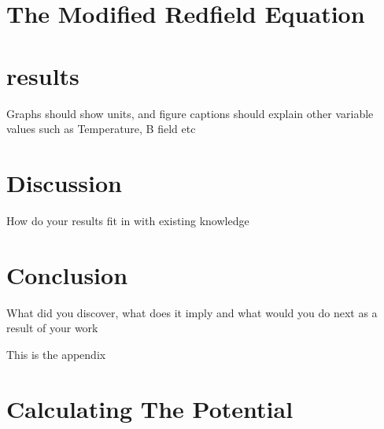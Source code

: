 \documentclass{article}
\begin{document}
\section{The Modified Redfield Equation}



\section{results}
Graphs should show units, and figure captions should explain other variable values such as Temperature, B
field etc

\section{Discussion}
How do your results fit in with existing knowledge

\section{Conclusion}
What did you discover, what does it imply and what would you do next as a result of your work

\begin{appendix}
    This is the appendix
    \section{Calculating The Potential}\label{app:interaction potential calculation}
    
\end{appendix}
\end{document}

